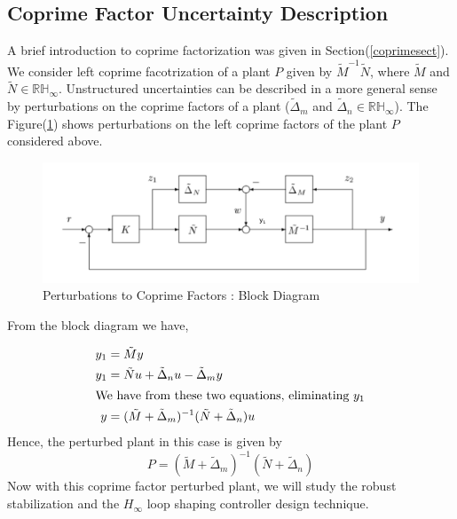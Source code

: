 \documentclass[a4paper,12pt]{article}
\begin{document}
	\subsection{Coprime Factor Uncertainty Description} A brief introduction to coprime factorization was given in Section(\ref{coprimesect}). We consider left coprime facotrization of a plant $P$ given by $\tilde{M}^{-1}\tilde{N}$, where $\tilde{M}$ and $\tilde{N} \in \mathbb{RH}_{\infty}$. 
% 
%			  
%			  
	Unstructured uncertainties can be described in a more general sense by perturbations on the coprime factors of a plant ($\tilde{\Delta}_{m}$ and $\tilde{\Delta}_{n} \in \mathbb{RH}_{\infty}$). The Figure(\ref{co2}) shows perturbations on the left coprime factors of the plant $P$ considered above. 
		\begin{figure}[H]
			  \centering
			  \includegraphics[scale=0.35]{co12}
%			  
			  \caption{Perturbations to Coprime Factors : Block Diagram}
			 \label{co2}
		\end{figure}	From the block diagram we have,
	
	\begin{align}
	y_{1}&=\tilde{M}y\\
	y_{1}&=\tilde{N}u + \tilde{\Delta}_{n}u - \tilde{\Delta}_{m}y\\
	\intertext{We have from these two equations, eliminating $y_{1}$} 
	y&=(\tilde{M} + \tilde{\Delta}_{m})^{-1}(\tilde{N}+\tilde{\Delta}_{n})u
	\end{align}
	Hence, the perturbed plant in this case is given by
	\begin{equation}
		\label{P1}
		P =(\tilde{M} + \tilde{\Delta}_{m})^{-1}(\tilde{N}+\tilde{\Delta}_{n})
	 \end{equation}
	 Now with this coprime factor perturbed plant, we will study the robust stabilization and the $H_{\infty}$ loop shaping controller design technique.
\end{document}
